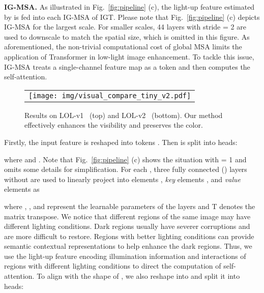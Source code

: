 \documentclass[10pt,twocolumn,letterpaper]{article}
\begin{document}
\vspace{1mm}
\noindent\textbf{IG-MSA.} As illustrated in Fig.~\ref{fig:pipeline} (c), the light-up feature  estimated by  is fed into each IG-MSA of IGT. Please note that Fig.~\ref{fig:pipeline} (c) depicts IG-MSA for the largest scale. For smaller scales, 44 layers with stride = 2  are used to downscale  to match the spatial size, which is omitted in this figure. As aforementioned, the non-trivial computational cost of global MSA limits the application of Transformer in low-light image enhancement. To tackle this issue, IG-MSA treats a single-channel feature map as a token and then  computes the self-attention.

\begin{figure*}[t]
	\begin{center}
		\begin{tabular}[t]{c} \hspace{-3.5mm}
\texttt{[image: img/visual\_compare\_tiny\_v2.pdf]}
\end{tabular}
	\end{center}
	\vspace*{-3mm}
	\caption{\small Results on LOL-v1~\cite{retinex_net} (top) and LOL-v2~\cite{lol_v2} (bottom).   Our method  effectively enhances the visibility and preserves the color.}
	\label{fig:compare}
	\vspace{-1mm}
\end{figure*}

Firstly, the input feature  is reshaped into tokens . Then  is split into  heads:
\vspace{-0.5mm}

where  and . Note that Fig.~\ref{fig:pipeline} (c) shows the situation with  = 1 and omits some details for simplification. For each , three fully connected () layers without  are used to linearly project  into  elements , \emph{key} elements , and \emph{value} elements  as 
\vspace{-1.5mm}

where , , and  represent the learnable parameters of the  layers and T denotes the matrix transpose. We notice that different regions of the same image may have different lighting conditions. Dark regions usually have severer corruptions and are more difficult to restore. Regions with better lighting conditions can provide semantic contextual representations to help enhance the dark regions. Thus, we use the light-up feature  encoding illumination information and interactions of regions with different lighting conditions to direct the computation of self-attention. To align with the shape of  , we also reshape  into  and split it into  heads:
\vspace{-0.5mm}
\end{document}
